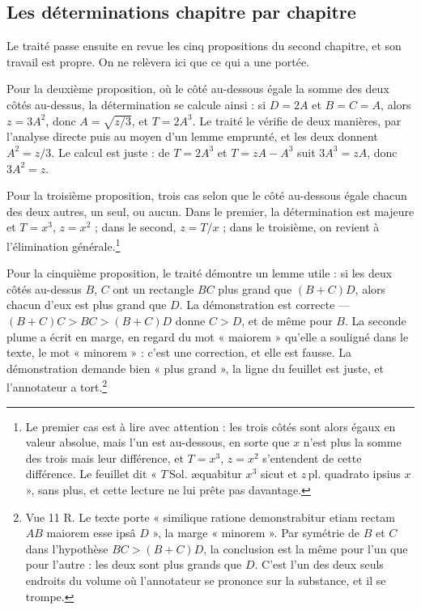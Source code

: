\documentclass[11pt,a4paper]{article}
\begin{document}
\subsection*{Les déterminations chapitre par chapitre}

Le traité passe ensuite en revue les cinq propositions du second chapitre, et
son travail est propre. On ne relèvera ici que ce qui a une portée.

Pour la deuxième proposition, où le côté au-dessous égale la somme des deux
côtés au-dessus, la détermination se calcule ainsi : si $D = 2A$ et $B = C = A$,
alors $z = 3A^2$, donc $A = \sqrt{z/3}$, et $T = 2A^3$. Le traité le vérifie de
deux manières, par l'analyse directe puis au moyen d'un lemme emprunté, et les
deux donnent $A^2 = z/3$. Le calcul est juste : de $T = 2A^3$ et
$T = zA - A^3$ suit $3A^3 = zA$, donc $3A^2 = z$.

Pour la troisième proposition, trois cas selon que le côté au-dessous égale
chacun des deux autres, un seul, ou aucun. Dans le premier, la détermination est
majeure et $T = x^3$, $z = x^2$ ; dans le second, $z = T/x$ ; dans le troisième,
on revient à l'élimination générale.\footnote{Le premier cas est à lire avec
attention : les trois côtés sont alors égaux en valeur absolue, mais l'un est
au-dessous, en sorte que $x$ n'est plus la somme des trois mais leur différence,
et $T = x^3$, $z = x^2$ s'entendent de cette différence. Le feuillet dit
« $T\,\mathrm{Sol.}$ æquabitur $x^3$ sicut et $z\,\mathrm{pl.}$ quadrato ipsius
$x$ », sans plus, et cette lecture ne lui prête pas davantage.}

Pour la cinquième proposition, le traité démontre un lemme utile : si les deux
côtés au-dessus $B$, $C$ ont un rectangle $BC$ plus grand que $(B+C)D$, alors
chacun d'eux est plus grand que $D$. La démonstration est correcte —
$(B+C)C > BC > (B+C)D$ donne $C > D$, et de même pour $B$. La seconde plume a
écrit en marge, en regard du mot « maiorem » qu'elle a souligné dans le texte,
le mot « minorem » : c'est une correction, et elle est fausse. La démonstration
demande bien « plus grand », la ligne du feuillet est juste, et l'annotateur a
tort.\footnote{Vue 11 R. Le texte porte « similique ratione demonstrabitur etiam
rectam $AB$ maiorem esse ipsâ $D$ », la marge « minorem ». Par symétrie de $B$
et $C$ dans l'hypothèse $BC > (B+C)D$, la conclusion est la même pour l'un que
pour l'autre : les deux sont plus grands que $D$. C'est l'un des deux seuls
endroits du volume où l'annotateur se prononce sur la substance, et il se trompe.}
\end{document}
